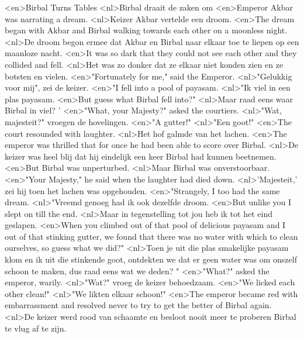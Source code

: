 <en>Birbal Turns Tables
<nl>Birbal draait de zaken om
<en>Emperor Akbar was narrating a dream.
<nl>Keizer Akbar vertelde een droom.
<en>The dream began with Akbar and Birbal walking towards each other on a moonless night.
<nl>De droom begon ermee dat Akbar en Birbal  naar elkaar toe te liepen op een maanloze nacht.
<en>It was so dark that they could not see each other and they collided and fell.
<nl>Het was zo donker dat ze elkaar niet konden zien en ze botsten en vielen.
<en>"Fortunately for me," said the Emperor.
<nl>"Gelukkig voor mij", zei de keizer.
<en>"I fell into a pool of payasam.
<nl>"Ik viel in een plas payasam.
<en>But guess what Birbal fell into?"
<nl>Maar raad eens waar Birbal in viel? '
<en>"What, your Majesty?" asked the courtiers.
<nl>"Wat, majesteit?" vroegen de hovelingen.
<en>"A gutter!"
<nl>"Een goot!"
<en>The court resounded with laughter.
<nl>Het hof galmde van het lachen.
<en>The emperor was thrilled that for once he had been able to score over Birbal.
<nl>De keizer was heel blij dat hij eindelijk een keer  Birbal had kunnen beetnemen.
<en>But Birbal was unperturbed.
<nl>Maar Birbal was onverstoorbaar.
<en>"Your Majesty," he said when the laughter had died down.
<nl>'Majesteit,' zei hij toen het lachen was opgehouden.
<en>"Strangely, I too had the same dream.
<nl>"Vreemd genoeg had ik ook dezelfde droom.
<en>But unlike you I slept on till the end.
<nl>Maar in tegenstelling tot jou heb ik tot het eind geslapen.
<en>When you climbed out of that pool of delicious payasam and I out of that stinking gutter, we found that there was no water with which to clean ourselves, so guess what we did?"
<nl>Toen je uit die plas smakelijke payasam klom en ik uit die stinkende goot, ontdekten we dat er geen water was om onszelf schoon te maken, dus raad eens wat we deden? "
<en>"What?" asked the emperor, warily.
<nl>"Wat?" vroeg de keizer behoedzaam.
<en>"We licked each other clean!"
<nl>"We likten elkaar schoon!"
<en>The emperor became red with embarrassment and resolved never to try to get the better of Birbal again.
<nl>De keizer werd rood van schaamte en besloot nooit meer te proberen Birbal te vlug af te zijn.
